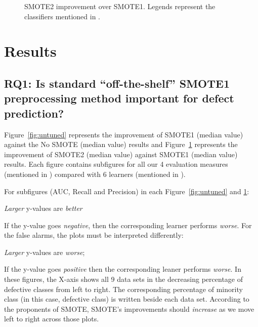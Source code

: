 \begin{figure}[!t]
    \caption{SMOTE2 improvement over SMOTE1. Legends represent the classifiers mentioned in .}
    \vspace{-10pt}
    \label{fig:tuned}
\end{figure}

\section{Results}
\label{sect:results}

\subsection{\textbf{RQ1: Is standard ``off-the-shelf'' SMOTE1 preprocessing method important for defect prediction?}}
Figure~\ref{fig:untuned} represents the improvement of SMOTE1 (median value) against the No SMOTE (median value) results and Figure~\ref{fig:tuned} represents the improvement of SMOTE2 (median value) against SMOTE1 (median value) results. Each figure contains subfigures for all our 4 evaluation measures (mentioned in ) compared with 6 learners (mentioned in ). 



For subfigures (AUC, Recall and Precision) in each Figure~\ref{fig:untuned} and \ref{fig:tuned}:
\bi
\item 
{\em Larger} y-values
are {\em better} 
\item
If the y-value goes {\em negative}, then the corresponding learner performs {\em worse}. 
\ei
For the false alarms, the
plots must be interpreted differently:
\bi
\item
{\em Larger} y-values are {\em worse};
\item
If the y-value goes {\em positive} then
the corresponding leaner
performs {\em worse}.
\ei
In these figures, the
X-axis shows all 9 data sets in the decreasing percentage of defective classes from left to right. The corresponding percentage of minority class (in this case, defective class) is written beside each data set. 
According to the proponents
of SMOTE, SMOTE's improvements should
{\em increase} as we move left to right
across those plots.

